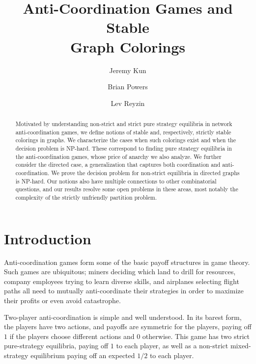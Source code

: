 \documentclass{llncs}
\title{Anti-Coordination Games and Stable \\Graph Colorings}
\begin{document}
\author{Jeremy Kun \and Brian Powers \and Lev Reyzin}


\maketitle


\begin{abstract}
Motivated by understanding non-strict and strict pure strategy equilibria in
network anti-coordination games, we define notions of stable and, respectively,
strictly stable colorings in graphs.  We characterize the cases when such
colorings exist and when the decision problem is NP-hard. These correspond to
finding pure strategy equilibria in the anti-coordination games, whose price of
anarchy we also analyze.  We further consider the directed case, a
generalization that captures both coordination and anti-coordination. We prove
the decision problem for non-strict equilibria in directed graphs is NP-hard.
Our notions also have multiple connections to other combinatorial questions,
and our results resolve some open problems in these areas, most notably the
complexity of the strictly unfriendly partition problem.
\end{abstract}

\section{Introduction}

Anti-coordination games form some of the basic payoff structures in game
theory.  Such games are ubiquitous; miners deciding which land to drill for
resources, company employees trying to learn diverse skills, and airplanes
selecting flight paths all need to mutually anti-coordinate their strategies in
order to maximize their profits or even avoid catastrophe.

Two-player anti-coordination is simple and well understood.  In its barest
form, the players have two actions, and payoffs are symmetric for the players,
paying off $1$ if the players choose different actions and $0$ otherwise.  This
game has two strict pure-strategy equilibria, paying off $1$ to each player, as
well as a non-strict mixed-strategy equilibrium paying off an expected $1/2$ to each
player.
\end{document}
